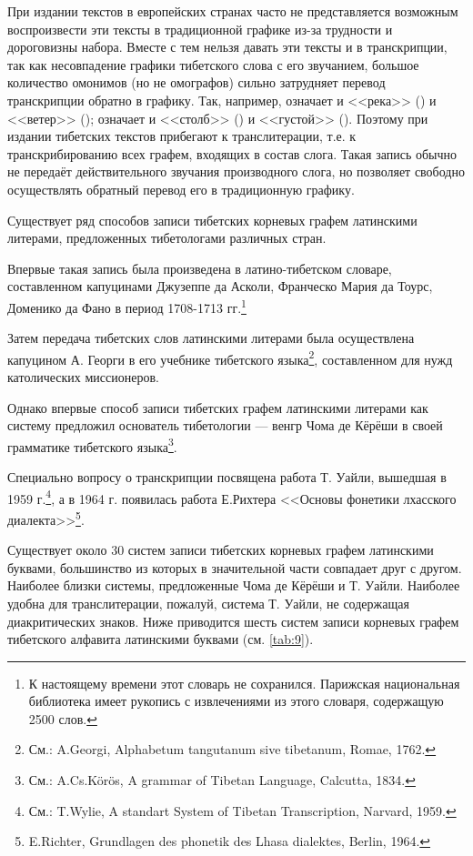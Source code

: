 При издании текстов в европейских странах часто не представляется возможным воспроизвести эти тексты в традиционной графике из-за трудности и дороговизны набора. Вместе с тем нельзя давать эти тексты и в транскрипции, так как несовпадение графики тибетского слова с его звучанием, большое количество омонимов (но не омографов) сильно затрудняет перевод транскрипции обратно в графику. Так, например,  означает и <<река>> () и <<ветер>> ();  означает и <<столб>> () и <<густой>> (). Поэтому при издании тибетских текстов прибегают к транслитерации, т.е. к транскрибированию всех графем, входящих в состав слога. Такая запись обычно не передаёт действительного звучания производного слога, но позволяет свободно осуществлять обратный перевод его в традиционную графику.

Существует ряд способов записи тибетских корневых графем латинскими литерами, предложенных тибетологами различных стран.

Впервые такая запись была произведена в латино-тибетском словаре, составленном капуцинами Джузеппе да Асколи, Франческо Мария да Тоурс, Доменико да Фано в период 1708-1713 гг.\footnote[12]{К настоящему времени этот словарь не сохранился. Парижская национальная библиотека имеет рукопись с извлечениями из этого словаря, содержащую 2500 слов.}

Затем передача тибетских слов латинскими литерами была осуществлена капуцином А. Георги в его учебнике тибетского языка\footnote[13]{См.: A.Georgi, Alphabetum tangutanum sive tibetanum, Romae, 1762.}, составленном для нужд католических миссионеров.

Однако впервые способ записи тибетских графем латинскими литерами как систему предложил основатель тибетологии --- венгр Чома де Кёрёши в своей грамматике тибетского языка\footnote[14]{См.: A.Cs.Körös, A grammar of Tibetan Language, Calcutta, 1834.}.

Специально вопросу о транскрипции посвящена работа Т. Уайли, вышедшая в 1959 г.\footnote[15]{См.: T.Wylie, A standart System of Tibetan Transcription, Narvard, 1959.}, а в 1964 г. появилась работа Е.Рихтера <<Основы фонетики лхасского диалекта>>\footnote[16]{E.Richter, Grundlagen des phonetik des Lhasa dialektes, Berlin, 1964.}.

Существует около 30 систем записи тибетских корневых графем латинскими буквами, большинство из которых в значительной части совпадает друг с другом. Наиболее близки системы, предложенные Чома де Кёрёши и Т. Уайли. Наиболее удобна для транслитерации, пожалуй, система Т. Уайли, не содержащая диакритических знаков. Ниже приводится шесть систем записи корневых графем тибетского алфавита латинскими буквами (см. \ref{tab:9}).

